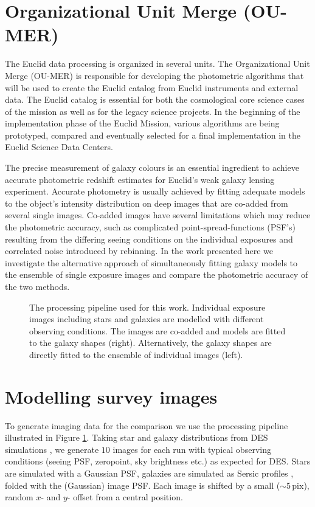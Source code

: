 \documentclass[11pt,twoside]{article}
\begin{document}
\section{Organizational Unit Merge (OU-MER)}
The Euclid data processing is organized in several units.
The Organizational Unit Merge (OU-MER) is responsible for developing the photometric
algorithms that will be used to create the Euclid catalog from Euclid instruments and
external data. The Euclid catalog is essential for both the
cosmological core science cases of the mission as well as for the
legacy science projects. In the beginning of the implementation phase of
the Euclid Mission, various algorithms are being
prototyped, compared and eventually selected for a final implementation in
the Euclid Science Data Centers.

The precise measurement of galaxy colours is an essential ingredient to achieve
accurate photometric redshift estimates for Euclid's weak galaxy lensing experiment.
Accurate photometry is usually achieved by fitting adequate models to the object's
intensity distribution on deep images that are co-added from several single images.
Co-added images have several limitations which may reduce the photometric
accuracy, such as complicated point-spread-functions (PSF's) resulting from the
differing seeing conditions on the individual exposures and correlated noise
introduced by rebinning. In the work presented here we investigate
the alternative approach of simultaneously fitting galaxy models to the ensemble of single exposure
images and compare the photometric accuracy of the two methods.

%
\begin{figure}[t]
\caption{The processing pipeline used for this work. Individual exposure images including
stars and galaxies are modelled with different observing conditions. The images are co-added
and models are fitted to the galaxy shapes (right). Alternatively, the galaxy shapes
are directly fitted to the ensemble of individual images (left).}
\label{fig1}
\end{figure}
%
\section{Modelling survey images}
To generate imaging data for the comparison we use the processing pipeline illustrated
in Figure \ref{fig1}. Taking star and galaxy distributions from DES simulations
\citep{2010AAS...21547007L}, we generate $10$ images for each run
with typical observing conditions (seeing PSF, zeropoint, sky brightness etc.)
as expected for DES. Stars are simulated with a Gaussian PSF, galaxies
are simulated as Sersic profiles \citep{1968adga.book.S}, folded with the (Gaussian)
image PSF. Each image is shifted by a small ($\sim5$\,pix), random $x$- and $y$- offset from a
central position.
\end{document}
